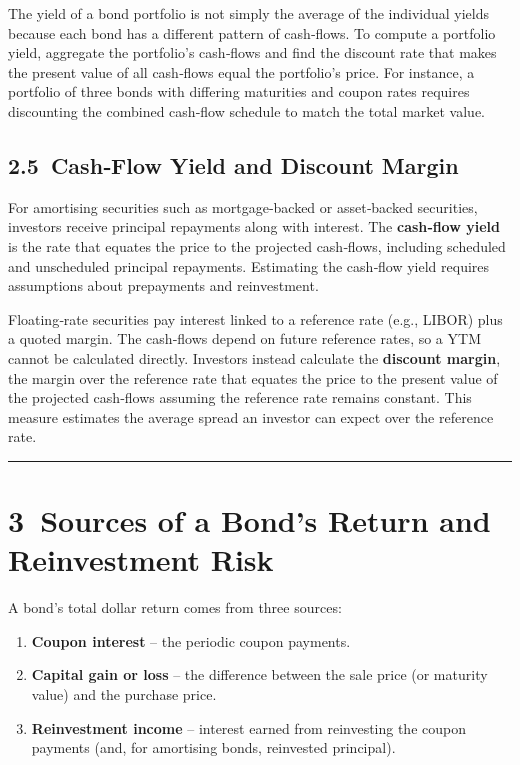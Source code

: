 \documentclass[
  letterpaper,
  DIV=11,
  numbers=noendperiod]{scrartcl}
\providecommand{\tightlist}{%
  \setlength{\itemsep}{0pt}\setlength{\parskip}{0pt}}
\begin{document}
The yield of a bond portfolio is not simply the average of the
individual yields because each bond has a different pattern of
cash‑flows. To compute a portfolio yield, aggregate the portfolio's
cash‑flows and find the discount rate that makes the present value of
all cash‑flows equal the portfolio's price. For instance, a portfolio of
three bonds with differing maturities and coupon rates requires
discounting the combined cash‑flow schedule to match the total market
value.

\subsection{2.5~Cash‑Flow Yield and Discount
Margin}\label{cashflow-yield-and-discount-margin}

For amortising securities such as mortgage‑backed or asset‑backed
securities, investors receive principal repayments along with interest.
The \textbf{cash‑flow yield} is the rate that equates the price to the
projected cash‑flows, including scheduled and unscheduled principal
repayments. Estimating the cash‑flow yield requires assumptions about
prepayments and reinvestment.

Floating‑rate securities pay interest linked to a reference rate (e.g.,
LIBOR) plus a quoted margin. The cash‑flows depend on future reference
rates, so a YTM cannot be calculated directly. Investors instead
calculate the \textbf{discount margin}, the margin over the reference
rate that equates the price to the present value of the projected
cash‑flows assuming the reference rate remains constant. This measure
estimates the average spread an investor can expect over the reference
rate.

\begin{center}\rule{0.5\linewidth}{0.5pt}\end{center}

\section{3~Sources of a Bond's Return and Reinvestment
Risk}\label{sources-of-a-bonds-return-and-reinvestment-risk}

A bond's total dollar return comes from three sources:

\begin{enumerate}
\def\labelenumi{\arabic{enumi}.}
\tightlist
\item
  \textbf{Coupon interest} -- the periodic coupon payments.
\item
  \textbf{Capital gain or loss} -- the difference between the sale price
  (or maturity value) and the purchase price.
\item
  \textbf{Reinvestment income} -- interest earned from reinvesting the
  coupon payments (and, for amortising bonds, reinvested principal).
\end{enumerate}
\end{document}
